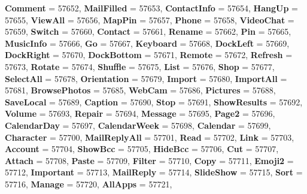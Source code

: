 \begin{DoxyCompactItemize}
{\bfseries Comment} = 57652, 
{\bfseries Mail\+Filled} = 57653, 
{\bfseries Contact\+Info} = 57654, 
{\bfseries Hang\+Up} = 57655, 
\newline
{\bfseries View\+All} = 57656, 
{\bfseries Map\+Pin} = 57657, 
{\bfseries Phone} = 57658, 
{\bfseries Video\+Chat} = 57659, 
\newline
{\bfseries Switch} = 57660, 
{\bfseries Contact} = 57661, 
{\bfseries Rename} = 57662, 
{\bfseries Pin} = 57665, 
\newline
{\bfseries Music\+Info} = 57666, 
{\bfseries Go} = 57667, 
{\bfseries Keyboard} = 57668, 
{\bfseries Dock\+Left} = 57669, 
\newline
{\bfseries Dock\+Right} = 57670, 
{\bfseries Dock\+Bottom} = 57671, 
{\bfseries Remote} = 57672, 
{\bfseries Refresh} = 57673, 
\newline
{\bfseries Rotate} = 57674, 
{\bfseries Shuffle} = 57675, 
{\bfseries List} = 57676, 
{\bfseries Shop} = 57677, 
\newline
{\bfseries Select\+All} = 57678, 
{\bfseries Orientation} = 57679, 
{\bfseries Import} = 57680, 
{\bfseries Import\+All} = 57681, 
\newline
{\bfseries Browse\+Photos} = 57685, 
{\bfseries Web\+Cam} = 57686, 
{\bfseries Pictures} = 57688, 
{\bfseries Save\+Local} = 57689, 
\newline
{\bfseries Caption} = 57690, 
{\bfseries Stop} = 57691, 
{\bfseries Show\+Results} = 57692, 
{\bfseries Volume} = 57693, 
\newline
{\bfseries Repair} = 57694, 
{\bfseries Message} = 57695, 
{\bfseries Page2} = 57696, 
{\bfseries Calendar\+Day} = 57697, 
\newline
{\bfseries Calendar\+Week} = 57698, 
{\bfseries Calendar} = 57699, 
{\bfseries Character} = 57700, 
{\bfseries Mail\+Reply\+All} = 57701, 
\newline
{\bfseries Read} = 57702, 
{\bfseries Link} = 57703, 
{\bfseries Account} = 57704, 
{\bfseries Show\+Bcc} = 57705, 
\newline
{\bfseries Hide\+Bcc} = 57706, 
{\bfseries Cut} = 57707, 
{\bfseries Attach} = 57708, 
{\bfseries Paste} = 57709, 
\newline
{\bfseries Filter} = 57710, 
{\bfseries Copy} = 57711, 
{\bfseries Emoji2} = 57712, 
{\bfseries Important} = 57713, 
\newline
{\bfseries Mail\+Reply} = 57714, 
{\bfseries Slide\+Show} = 57715, 
{\bfseries Sort} = 57716, 
{\bfseries Manage} = 57720, 
\newline
{\bfseries All\+Apps} = 57721, 

\end{DoxyCompactItemize}
